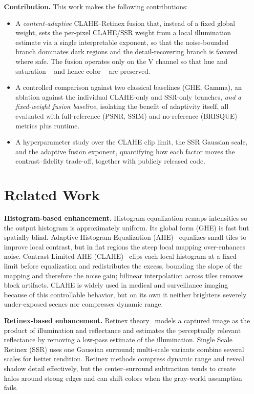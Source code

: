 \documentclass[conference,a4paper]{IEEEtran}
\begin{document}
\textbf{Contribution.} This work makes the following contributions:
\begin{itemize}
\item A \emph{content-adaptive} CLAHE--Retinex fusion that, instead of a fixed
global weight, sets the per-pixel CLAHE/SSR weight from a local illumination
estimate via a single interpretable exponent, so that the noise-bounded branch
dominates dark regions and the detail-recovering branch is favored where safe.
The fusion operates only on the V channel so that hue and saturation -- and
hence color -- are preserved.
\item A controlled comparison against two classical baselines (GHE, Gamma), an
ablation against the individual CLAHE-only and SSR-only branches, \emph{and a
fixed-weight fusion baseline}, isolating the benefit of adaptivity itself, all
evaluated with full-reference (PSNR, SSIM) and no-reference (BRISQUE) metrics
plus runtime.
\item A hyperparameter study over the CLAHE clip limit, the SSR Gaussian scale,
and the adaptive fusion exponent, quantifying how each factor moves the
contrast--fidelity trade-off, together with publicly released code.
\end{itemize}

\section{Related Work}
\label{sec:related}
\textbf{Histogram-based enhancement.} Histogram equalization remaps intensities
so the output histogram is approximately uniform. Its global form (GHE) is fast
but spatially blind. Adaptive Histogram Equalization
(AHE)~\cite{pizer1987ahe} equalizes small tiles to improve local contrast, but
in flat regions the steep local mapping over-enhances noise. Contrast Limited
AHE (CLAHE)~\cite{zuiderveld1994clahe} clips each local histogram at a fixed
limit before equalization and redistributes the excess, bounding the slope of
the mapping and therefore the noise gain; bilinear interpolation across tiles
removes block artifacts. CLAHE is widely used in medical and surveillance
imaging because of this controllable behavior, but on its own it neither
brightens severely under-exposed scenes nor compresses dynamic range.

\textbf{Retinex-based enhancement.} Retinex theory~\cite{jobson1997retinex}
models a captured image as the product of illumination and reflectance and
estimates the perceptually relevant reflectance by removing a low-pass estimate
of the illumination. Single Scale Retinex (SSR) uses one Gaussian surround;
multi-scale variants combine several scales for better rendition. Retinex
methods compress dynamic range and reveal shadow detail effectively, but the
center--surround subtraction tends to create halos around strong edges and can
shift colors when the gray-world assumption fails.
\end{document}
